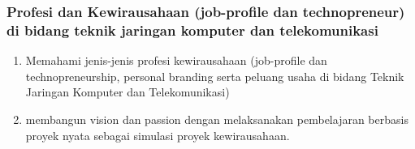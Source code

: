 \documentclass[11pt]{article}
\begin{document}
\subsubsection{Profesi dan Kewirausahaan (job-profile  dan technopreneur) di bidang teknik jaringan komputer dan telekomunikasi}
\label{sec:org563ff25}
\begin{enumerate}
\item Memahami jenis-jenis profesi kewirausahaan (job-profile dan technopreneurship, personal branding serta peluang usaha di bidang Teknik Jaringan Komputer dan Telekomunikasi)
\label{sec:orgff185ee}
\item membangun vision dan passion dengan melaksanakan pembelajaran berbasis proyek nyata sebagai simulasi proyek kewirausahaan.
\label{sec:orgc405764}
\end{enumerate}
\end{document}
